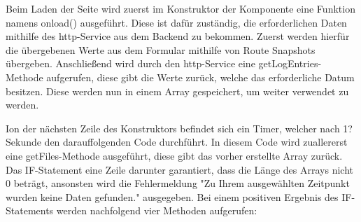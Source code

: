 Beim Laden der Seite wird zuerst im Konstruktor der Komponente eine Funktion namens onload() ausgeführt. Diese ist dafür zuständig, die erforderlichen Daten mithilfe des http-Service aus dem Backend zu bekommen. Zuerst werden hierfür die übergebenen Werte aus dem Formular mithilfe von Route Snapshots übergeben. Anschließend wird durch den http-Service eine getLogEntries-Methode aufgerufen, diese gibt die Werte zurück, welche das erforderliche Datum besitzen. Diese werden nun in einem Array gespeichert, um weiter verwendet zu werden.

Ion der nächsten Zeile des Konstruktors befindet sich ein Timer, welcher nach 1? Sekunde den darauffolgenden Code durchführt. In diesem Code wird zuallererst eine getFiles-Methode ausgeführt, diese gibt das vorher erstellte Array zurück. Das IF-Statement eine Zeile darunter garantiert, dass die Länge des Arrays nicht 0 beträgt, ansonsten wird die Fehlermeldung "Zu Ihrem ausgewählten Zeitpunkt wurden keine Daten gefunden." ausgegeben. Bei einem positiven Ergebnis des IF-Statements werden nachfolgend vier Methoden aufgerufen: 

